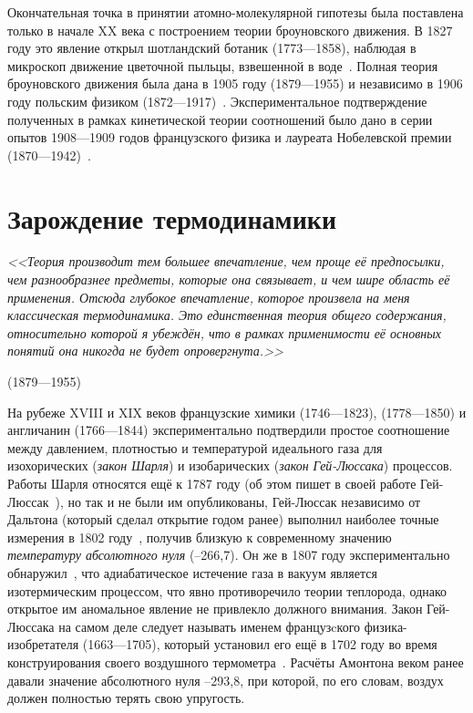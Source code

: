 \documentclass[a4paper, 12pt, oneside]{article} %
\begin{document}
Окончательная точка в принятии атомно-молекулярной гипотезы была
поставлена только в начале XX века с построением теории броуновского
движения. В 1827 году это явление открыл шотландский ботаник
 (1773---1858), наблюдая в микроскоп движение
цветочной пыльцы, взвешенной в воде~\cite{brown1828motion}. Полная
теория броуновского движения была дана в 1905 году  (1879---1955) и независимо в 1906 году польским физиком
 (1872---1917)~\cite{brownian1936motion}.
Экспериментальное подтверждение полученных в рамках кинетической теории
соотношений было дано в серии опытов 1908---1909 годов французского
физика и лауреата Нобелевской премии 
(1870---1942)~\cite{perrin1909movement}.

\section{Зарождение термодинамики}

\epigraph{\textit{<<Теория производит тем большее впечатление, чем проще
её предпосылки, чем разнообразнее предметы, которые она связывает, и чем
шире область её применения. Отсюда глубокое впечатление, которое
произвела на меня классическая термодинамика. Это единственная теория
общего содержания, относительно которой я убеждён, что в рамках
применимости её основных понятий она никогда не будет
опровергнута.>>}}{ (1879---1955)}

На рубеже XVIII и XIX веков французские химики 
(1746---1823),  (1778---1850) и англичанин
 (1766---1844) экспериментально подтвердили простое
соотношение между давлением, плотностью и температурой идеального газа
для изохорических (\emph{закон Шарля}) и изобарических (\emph{закон
Гей-Люссака}) процессов. Работы Шарля относятся ещё к 1787 году (об этом
пишет в своей работе Гей-Люссак~\cite{gay1802recherches}), но так и не
были им опубликованы, Гей-Люссак независимо от Дальтона (который сделал
открытие годом ранее) выполнил наиболее точные измерения в 1802
году~\cite{gay1802recherches}, получив близкую к современному значению
\emph{температуру абсолютного нуля} (–266,7\celsius). Он же в 1807 году
экспериментально обнаружил~\cite{gay1807premier}, что адиабатическое
истечение газа в вакуум является изотермическим процессом, что явно
противоречило теории теплорода, однако открытое им аномальное явление не
привлекло должного внимания. Закон Гей-Люссака на самом деле следует
называть именем французcкого физика-изобретателя  (1663---1705), который установил его ещё в 1702 году во время
конструирования своего воздушного
термометра~\cite{amontons1703thermometre}. Расчёты Амонтона веком ранее
давали значение абсолютного нуля –293,8\celsius, при которой, по его
словам, воздух должен полностью терять свою упругость.
\end{document}
